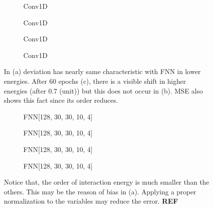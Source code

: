 \documentclass[a4paper,times,12pt]{article}
\begin{document}
\begin{figure}[H]
    \centering
    \begin{subfigure}[t]{0.45\textwidth}
		\centering
        
        \caption{Conv1D}
		\label{fig:a}
    \end{subfigure}\hfill
    \begin{subfigure}[t]{0.45\textwidth}
		\centering
        
        \caption{Conv1D}
		\label{fig:b}
    \end{subfigure}\hfill    
    \begin{subfigure}[t]{0.45\textwidth}
        \centering
        
        \caption{Conv1D}
		\label{fig:c}
    \end{subfigure}\hfill
    \begin{subfigure}[t]{0.45\textwidth}
        \centering
        
        \caption{Conv1D}
		\label{fig:c}
    \end{subfigure}
	\caption{In (a) deviation has nearly same characteristic with FNN in lower energies. After 60 epochs (c), there is a visible shift in higher energies (after 0.7 (unit)) but this does not occur in (b). MSE also shows this fact since its order reduces.}
\end{figure}

\begin{figure}[H]
    \centering
    \begin{subfigure}[t]{0.45\textwidth}
		\centering
        
        \caption{FNN[128, 30, 30, 10, 4]}
		\label{fig:a}
    \end{subfigure}\hfill
    \begin{subfigure}[t]{0.45\textwidth}
		\centering
        
        \caption{FNN[128, 30, 30, 10, 4]}
		\label{fig:b}
    \end{subfigure}\hfill    
    \begin{subfigure}[t]{0.45\textwidth}
        \centering
        
        \caption{FNN[128, 30, 30, 10, 4]}
		\label{fig:c}
    \end{subfigure}\hfill
    \begin{subfigure}[t]{0.45\textwidth}
        \centering
        
        \caption{FNN[128, 30, 30, 10, 4]}
		\label{fig:c}
    \end{subfigure}
	\caption{Notice that, the order of interaction energy is much smaller than the others. This may be the reason of bias in (a). Applying a proper normalization to the variables may reduce the error. \textbf{REF}}
\end{figure}
\end{document}
